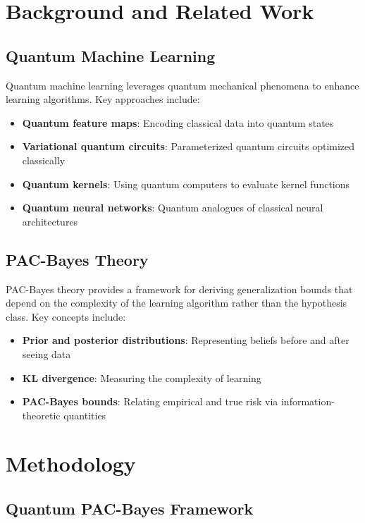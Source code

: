 \documentclass{article}
\begin{document}
\section{Background and Related Work}

\subsection{Quantum Machine Learning}

Quantum machine learning leverages quantum mechanical phenomena to enhance learning algorithms. Key approaches include:

\begin{itemize}
\item \textbf{Quantum feature maps}: Encoding classical data into quantum states
\item \textbf{Variational quantum circuits}: Parameterized quantum circuits optimized classically
\item \textbf{Quantum kernels}: Using quantum computers to evaluate kernel functions
\item \textbf{Quantum neural networks}: Quantum analogues of classical neural architectures
\end{itemize}

\subsection{PAC-Bayes Theory}

PAC-Bayes theory provides a framework for deriving generalization bounds that depend on the complexity of the learning algorithm rather than the hypothesis class. Key concepts include:

\begin{itemize}
\item \textbf{Prior and posterior distributions}: Representing beliefs before and after seeing data
\item \textbf{KL divergence}: Measuring the complexity of learning
\item \textbf{PAC-Bayes bounds}: Relating empirical and true risk via information-theoretic quantities
\end{itemize}

\section{Methodology}

\subsection{Quantum PAC-Bayes Framework}
\end{document}
